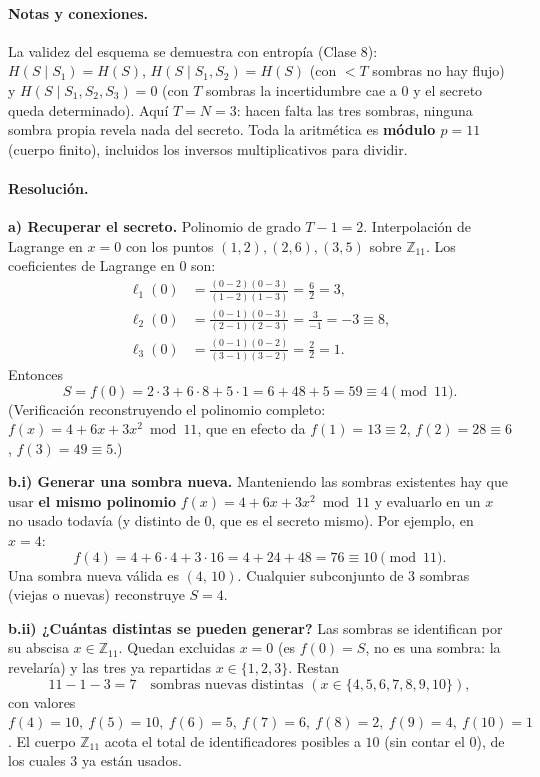 \paragraph{Notas y conexiones.} La validez del esquema se demuestra con entropía
(Clase 8): $H(S\mid S_1)=H(S)$, $H(S\mid S_1,S_2)=H(S)$ (con $<T$ sombras no hay flujo) y
$H(S\mid S_1,S_2,S_3)=0$ (con $T$ sombras la incertidumbre cae a $0$ y el secreto queda
determinado). Aquí $T=N=3$: hacen falta las tres sombras, ninguna sombra propia revela nada del
secreto. Toda la aritmética es \textbf{módulo $p=11$} (cuerpo finito), incluidos los inversos
multiplicativos para dividir.

\paragraph{Resolución.}
\textbf{a) Recuperar el secreto.} Polinomio de grado $T-1=2$. Interpolación de Lagrange en
$x=0$ con los puntos $(1,2),(2,6),(3,5)$ sobre $\mathbb{Z}_{11}$. Los coeficientes de Lagrange
en $0$ son:
\begin{align*}
  \ell_1(0) &= \frac{(0-2)(0-3)}{(1-2)(1-3)} = \frac{6}{2} = 3, \\
  \ell_2(0) &= \frac{(0-1)(0-3)}{(2-1)(2-3)} = \frac{3}{-1} = -3 \equiv 8, \\
  \ell_3(0) &= \frac{(0-1)(0-2)}{(3-1)(3-2)} = \frac{2}{2} = 1.
\end{align*}
Entonces
\begin{equation*}
  S = f(0) = 2\cdot 3 + 6\cdot 8 + 5\cdot 1 = 6 + 48 + 5 = 59 \equiv 4 \pmod{11}.
\end{equation*}
 (Verificación reconstruyendo el polinomio completo: $f(x)=4+6x+3x^2 \bmod 11$,
que en efecto da $f(1)=13\equiv2$, $f(2)=28\equiv6$, $f(3)=49\equiv5$.)

\medskip
\textbf{b.i) Generar una sombra nueva.} Manteniendo las sombras existentes hay que usar
\textbf{el mismo polinomio} $f(x)=4+6x+3x^2 \bmod 11$ y evaluarlo en un $x$ no usado todavía
(y distinto de $0$, que es el secreto mismo). Por ejemplo, en $x=4$:
\begin{equation*}
  f(4) = 4 + 6\cdot4 + 3\cdot16 = 4 + 24 + 48 = 76 \equiv 10 \pmod{11}.
\end{equation*}
Una sombra nueva válida es $\boxed{(4,\,10)}$. Cualquier subconjunto de $3$ sombras (viejas o
nuevas) reconstruye $S=4$.

\medskip
\textbf{b.ii) ¿Cuántas distintas se pueden generar?} Las sombras se identifican por su
abscisa $x \in \mathbb{Z}_{11}$. Quedan excluidas $x=0$ (es $f(0)=S$, no es una sombra: la
revelaría) y las tres ya repartidas $x\in\{1,2,3\}$. Restan
\begin{equation*}
  11 - 1 - 3 = \boxed{7} \quad\text{sombras nuevas distintas } (x \in \{4,5,6,7,8,9,10\}),
\end{equation*}
con valores $f(4)=10,\ f(5)=10,\ f(6)=5,\ f(7)=6,\ f(8)=2,\ f(9)=4,\ f(10)=1$. El cuerpo
$\mathbb{Z}_{11}$ acota el total de identificadores posibles a $10$ (sin contar el $0$), de los
cuales $3$ ya están usados.

